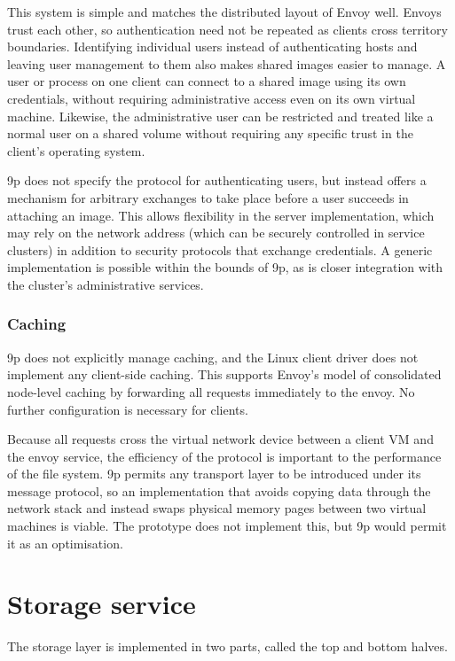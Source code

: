 This system is simple and matches the distributed layout of Envoy well. Envoys trust each other, so authentication need not be repeated as clients cross territory boundaries. Identifying individual users instead of authenticating hosts and leaving user management to them also makes shared images easier to manage. A user or process on one client can connect to a shared image using its own credentials, without requiring administrative access even on its own virtual machine. Likewise, the administrative user can be restricted and treated like a normal user on a shared volume without requiring any specific trust in the client's operating system.

9p does not specify the protocol for authenticating users, but instead offers a mechanism for arbitrary exchanges to take place before a user succeeds in attaching an image. This allows flexibility in the server implementation, which may rely on the network address (which can be securely controlled in service clusters) in addition to security protocols that exchange credentials. A generic implementation is possible within the bounds of 9p, as is closer integration with the cluster's administrative services.

\subsubsection{Caching}

9p does not explicitly manage caching, and the Linux client driver does not implement any client-side caching. This supports Envoy's model of consolidated node-level caching by forwarding all requests immediately to the envoy. No further configuration is necessary for clients.

Because all requests cross the virtual network device between a client VM and the envoy service, the efficiency of the protocol is important to the performance of the file system. 9p permits any transport layer to be introduced under its message protocol, so an implementation that avoids copying data through the network stack and instead swaps physical memory pages between two virtual machines is viable. The prototype does not implement this, but 9p would permit it as an optimisation.

\section{Storage service}

The storage layer is implemented in two parts, called the top and bottom halves.

